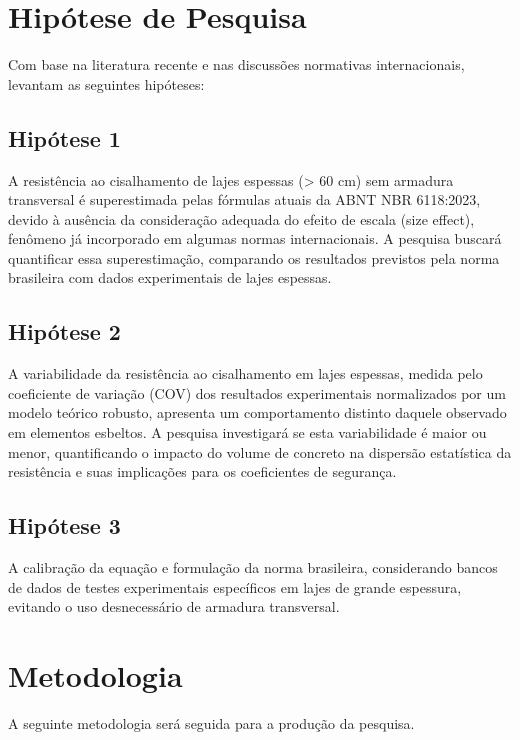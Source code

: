 \chapter{Hipótese de Pesquisa}
Com base na literatura recente e nas discussões normativas internacionais, levantam as seguintes hipóteses:

\section{Hipótese 1}
A resistência ao cisalhamento de lajes espessas (> 60 cm) sem armadura transversal é superestimada pelas fórmulas atuais da ABNT NBR 6118:2023, devido à ausência da consideração adequada do efeito de escala (size effect), fenômeno já incorporado em algumas normas internacionais. A pesquisa buscará quantificar essa superestimação, comparando os resultados previstos pela norma brasileira com dados experimentais de lajes espessas.
\section{Hipótese 2}
A variabilidade da resistência ao cisalhamento em lajes espessas, medida pelo coeficiente de variação (COV) dos resultados experimentais normalizados por um modelo teórico robusto, apresenta um comportamento distinto daquele observado em elementos esbeltos. A pesquisa investigará se esta variabilidade é maior ou menor, quantificando o impacto do volume de concreto na dispersão estatística da resistência e suas implicações para os coeficientes de segurança. 
\section{Hipótese 3}
A calibração da equação e formulação da norma brasileira, considerando bancos de dados de testes experimentais específicos em lajes de grande espessura, evitando o uso desnecessário de armadura transversal.

\chapter{Metodologia}
A seguinte metodologia será seguida para a produção da pesquisa.

